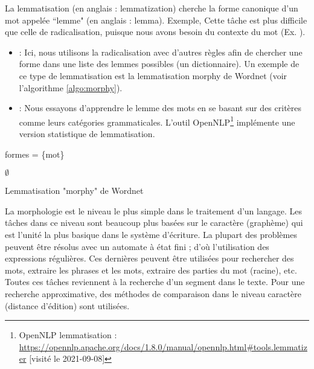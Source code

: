 \documentclass{KodeBook}
\begin{document}
La lemmatisation (en anglais : lemmatization) cherche la forme canonique d'un mot appelée ``lemme" (en anglais : lemma).
Exemple, 
Cette tâche est plus difficile que celle de radicalisation, puisque nous avons besoin du contexte du mot (Ex. ). 
\begin{itemize}
	\item {} : Ici, nous utilisons la radicalisation avec d'autres règles afin de chercher une forme dans une liste des lemmes possibles (un dictionnaire).
	Un exemple de ce type de lemmatisation est la lemmatisation morphy de Wordnet (voir l'algorithme \ref{algo:morphy}).
	
	\item {} : Nous essayons d'apprendre le lemme des mots en se basant sur des critères comme leurs catégories grammaticales.
	L'outil OpenNLP\footnote{OpenNLP lemmatisation : \url{https://opennlp.apache.org/docs/1.8.0/manual/opennlp.html\#tools.lemmatizer} [visité le 2021-09-08]} implémente une version statistique de lemmatisation.

\end{itemize}

\begin{algorithm}[H]
		
		
		formes = \{mot\}
		
		
		\Return $ \emptyset $\;
		
		\caption{Lemmatisation "morphy" de Wordnet \label{algo:morphy}}
		
	\end{algorithm}

	La morphologie est le niveau le plus simple dans le traitement d'un langage. 
	Les tâches dans ce niveau sont beaucoup plus basées sur le caractère (graphème) qui est l'unité la plus basique dans le système d'écriture.  
	La plupart des problèmes peuvent être résolus avec un automate à état fini ; d'où l'utilisation des expressions régulières. 
	Ces dernières peuvent être utilisées pour rechercher des mots, extraire les phrases et les mots, extraire des parties du mot (racine), etc. 
	Toutes ces tâches reviennent à la recherche d'un segment dans le texte. 
	Pour une recherche approximative, des méthodes de comparaison dans le niveau caractère (distance d'édition) sont utilisées. 
	
\end{document}
